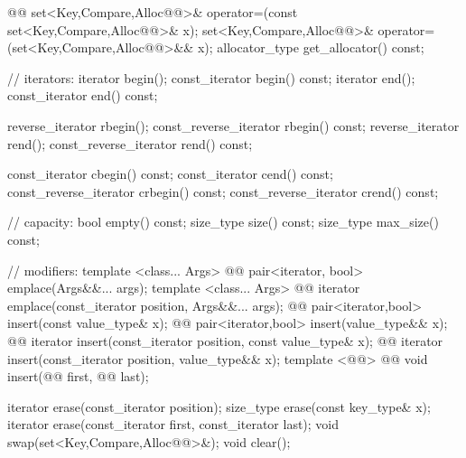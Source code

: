 \documentclass[american,twoside]{book}
\begin{document}
\begin{codeblock}
{{    @@
      set<Key,Compare,Alloc@@>& operator=(const set<Key,Compare,Alloc@@>& x);
    set<Key,Compare,Alloc@@>& operator=(set<Key,Compare,Alloc@@>&& x);
    allocator_type get_allocator() const;

    // iterators:
    iterator               begin();
    const_iterator         begin() const;
    iterator               end();
    const_iterator         end() const;

    reverse_iterator       rbegin();
    const_reverse_iterator rbegin() const;
    reverse_iterator       rend();
    const_reverse_iterator rend() const;

    const_iterator         cbegin() const;
    const_iterator         cend() const;
    const_reverse_iterator crbegin() const;
    const_reverse_iterator crend() const;

    // capacity:
    bool          empty() const;
    size_type     size() const;
    size_type     max_size() const;

    // modifiers:
    template <class... Args> 
      @@
      pair<iterator, bool> emplace(Args&&... args);
    template <class... Args> 
      @@
      iterator emplace(const_iterator position, Args&&... args);
    @@ 
      pair<iterator,bool> insert(const value_type& x);
    @@ 
      pair<iterator,bool> insert(value_type&& x);
    @@ 
      iterator insert(const_iterator position, const value_type& x);
    @@ 
      iterator insert(const_iterator position, value_type&& x);
    template <@@>
      @@
      void insert(@@ first, @@ last);

    iterator  erase(const_iterator position);
    size_type erase(const key_type& x);
    iterator  erase(const_iterator first, const_iterator last);
    void swap(set<Key,Compare,Alloc@@>&);
    void clear();

}}
\end{codeblock}
\end{document}
